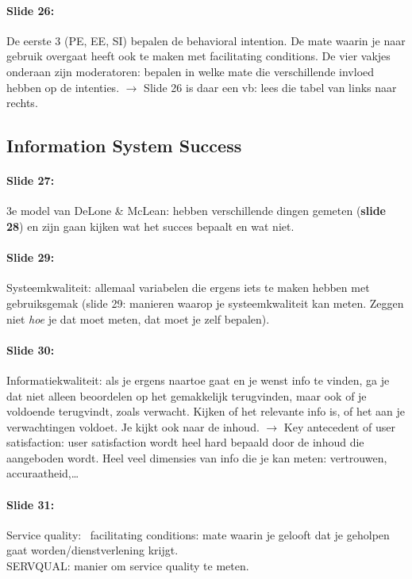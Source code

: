 \documentclass[10pt,a4paper]{report}
\begin{document}
\paragraph{Slide 26:}De eerste 3 (PE, EE, SI) bepalen de behavioral intention. De mate waarin je naar gebruik overgaat heeft ook te maken met facilitating conditions. De vier vakjes onderaan zijn moderatoren: bepalen in welke mate die verschillende invloed hebben op de intenties. $\rightarrow$ Slide 26 is daar een vb: lees die tabel van links naar rechts.

\subsection{Information System Success}
\paragraph{Slide 27:}3e model van DeLone \& McLean: hebben verschillende dingen gemeten (\textbf{slide 28}) en zijn gaan kijken wat het succes bepaalt en wat niet.

\paragraph{Slide 29:}Systeemkwaliteit: allemaal variabelen die ergens iets te maken hebben met gebruiksgemak (slide 29: manieren waarop je systeemkwaliteit kan meten. Zeggen niet \emph{hoe} je dat moet meten, dat moet je zelf bepalen).

\paragraph{Slide 30:}Informatiekwaliteit: als je ergens naartoe gaat en je wenst info te vinden, ga je dat niet alleen beoordelen op het gemakkelijk terugvinden, maar ook of je voldoende terugvindt, zoals verwacht. Kijken of het relevante info is, of het aan je verwachtingen voldoet. Je kijkt ook naar de inhoud. $\rightarrow$ Key antecedent of user satisfaction: user satisfaction wordt heel hard bepaald door de inhoud die aangeboden wordt. Heel veel dimensies van info die je kan meten: vertrouwen, accuraatheid,…

\paragraph{Slide 31:}Service quality: ~facilitating conditions: mate waarin je gelooft dat je geholpen gaat worden/dienstverlening krijgt.\\ SERVQUAL: manier om service quality te meten.
\end{document}
